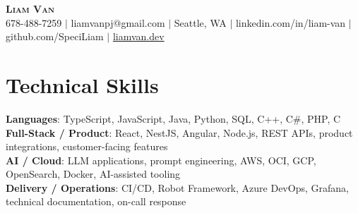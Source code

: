 \documentclass[letterpaper,11pt]{article}
\begin{document}

%
\begin{center}
    \textbf{\Huge \scshape Liam Van} \\ \vspace{1pt}
    \small 678-488-7259 $|$ \small {liamvanpj@gmail.com} $|$ Seattle, WA
 {{$|$ linkedin.com/in/liam-van} {$|$ github.com/SpeciLiam} {$|$ \href{https://liamvan.dev}{liamvan.dev}}}

\end{center}

\section{Technical Skills}
 \begin{itemize}[leftmargin=0.15in, label={}]
    \small{\item{
     \textbf{Languages}{: TypeScript, JavaScript, Java, Python, SQL, C++, C\#, PHP, C} \\
     \textbf{Full-Stack / Product}{: React, NestJS, Angular, Node.js, REST APIs, product integrations, customer-facing features} \\
     \textbf{AI / Cloud}{: LLM applications, prompt engineering, AWS, OCI, GCP, OpenSearch, Docker, AI-assisted tooling} \\
     \textbf{Delivery / Operations}{: CI/CD, Robot Framework, Azure DevOps, Grafana, technical documentation, on-call response} \\
    }}
 \end{itemize}
%

\end{document}
